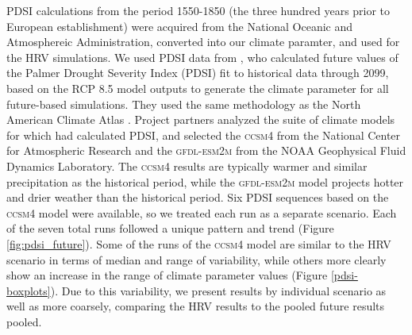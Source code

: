 \documentclass[12pt]{article}
\begin{document}
\begin{spacing}{1}
PDSI calculations from the period 1550-1850 (the three hundred years prior to European establishment) were acquired from the National Oceanic and Atmosphereic Administration, converted into our climate paramter, and used for the HRV simulations. %
We used PDSI data from \citet{Cook2014}, who calculated future values of the Palmer Drought Severity Index (PDSI) fit to historical data through 2099, based on the RCP 8.5 model outputs to generate the climate parameter for all future-based simulations. They used the same methodology as the North American Climate Atlas \citep{Cook2004}. Project partners analyzed the suite of climate models for which \citet{Cook2014} had calculated PDSI, and selected the \textsc{ccsm4} from the National Center for Atmospheric Research and the \textsc{gfdl-esm2m} from the NOAA Geophysical Fluid Dynamics Laboratory. The \textsc{ccsm4} results are typically warmer and similar precipitation as the historical period, while the \textsc{gfdl-esm2m} model projects hotter and drier weather than the historical period. Six PDSI sequences based on the \textsc{ccsm4} model were available, so we treated each run as a separate scenario. Each of the seven total runs followed a unique pattern and trend (Figure \ref{fig:pdsi_future}). Some of the runs of the \textsc{ccsm4} model are similar to the HRV scenario in terms of median and range of variability, while others more clearly show an increase in the range of climate parameter values (Figure \ref{pdsi-boxplots}). Due to this variability, we present results by individual scenario as well as more coarsely, comparing the HRV results to the pooled future results pooled. 




\end{spacing}
\end{document}
